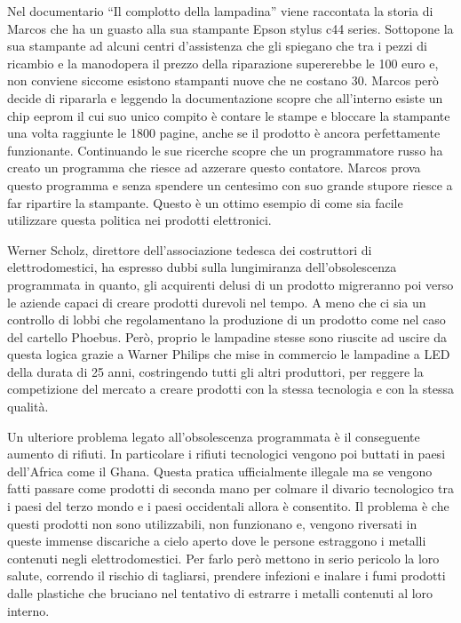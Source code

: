 \documentclass[12pt]{book} %
\begin{document}
Nel documentario “Il complotto della lampadina” viene raccontata
la storia di Marcos che ha un guasto alla sua stampante Epson stylus c44 series. Sottopone la sua stampante ad alcuni
centri d'assistenza che gli spiegano che tra i pezzi di ricambio e la manodopera il prezzo della
riparazione supererebbe le 100 euro e, non conviene siccome esistono stampanti nuove che ne costano 30. Marcos però
decide di ripararla e leggendo la documentazione scopre che all'interno esiste un chip eeprom il
cui suo unico compito è contare le stampe e bloccare la stampante una volta raggiunte le 1800 pagine, anche se il
prodotto è ancora perfettamente funzionante. Continuando le sue ricerche scopre che un programmatore russo ha creato un
programma che riesce ad azzerare questo contatore. Marcos prova questo
programma e senza spendere un centesimo con suo grande stupore riesce a far ripartire la stampante. Questo è un ottimo
esempio di come sia facile utilizzare questa politica nei prodotti elettronici.

Werner Scholz, direttore dell'associazione tedesca dei costruttori di elettrodomestici, ha espresso dubbi sulla
lungimiranza dell'obsolescenza programmata in quanto, gli acquirenti delusi di un prodotto migreranno poi verso le
aziende capaci di creare prodotti durevoli nel tempo. A meno che ci sia un controllo di lobbi che regolamentano la
produzione di un prodotto come nel caso del cartello Phoebus. Però, proprio le lampadine stesse sono riuscite ad uscire
da questa logica grazie a Warner Philips che mise in commercio le lampadine a LED della durata di 25 anni, costringendo
tutti gli altri produttori, per reggere la competizione del mercato a creare prodotti con la stessa tecnologia e con la
stessa qualità.

Un ulteriore problema legato all'obsolescenza programmata è il conseguente aumento di rifiuti. In
particolare i rifiuti tecnologici vengono poi buttati in paesi dell'Africa come il Ghana. Questa
pratica ufficialmente illegale ma se vengono fatti passare come prodotti di seconda mano per colmare il divario
tecnologico tra i paesi del terzo mondo e i paesi occidentali allora è consentito. Il problema è che questi prodotti
non sono utilizzabili, non funzionano e, vengono riversati in queste immense discariche a cielo aperto dove le persone
estraggono i metalli contenuti negli elettrodomestici. Per farlo però mettono in serio pericolo la loro salute,
correndo il rischio di tagliarsi, prendere infezioni e inalare i fumi prodotti dalle plastiche che bruciano nel
tentativo di estrarre i metalli contenuti al loro interno.
\end{document}

